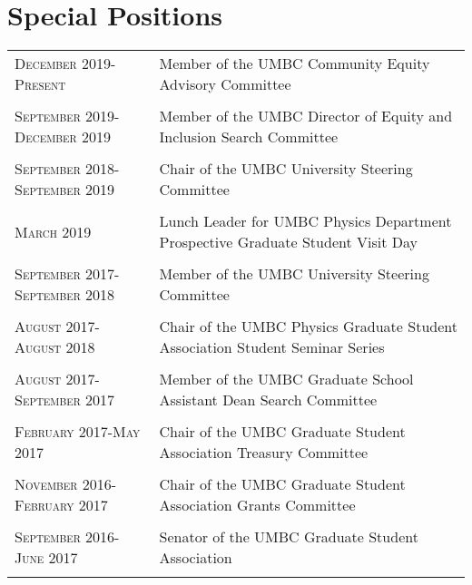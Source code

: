 %
%
%

\section{\texorpdfstring{\color{Blue}Special Positions}{Special Positions}}
\begin{longtable}{p{2.5cm}|p{14.8cm}}
 	\textsc{December 2019-Present}& Member of the UMBC Community Equity Advisory Committee\\
    \multicolumn{2}{c}{} \\
    \textsc{September 2019-December 2019}& Member of the UMBC Director of Equity and Inclusion Search Committee\\
    \multicolumn{2}{c}{} \\
    \textsc{September 2018-September 2019}& Chair of the UMBC University Steering Committee\\
    \multicolumn{2}{c}{} \\
    \textsc{March 2019}& Lunch Leader for UMBC Physics Department Prospective Graduate Student Visit Day\\
    \multicolumn{2}{c}{} \\
    \textsc{September 2017-September 2018}& Member of the UMBC University Steering Committee\\
    \multicolumn{2}{c}{} \\
    \textsc{August 2017-August 2018}& Chair of the UMBC Physics Graduate Student Association Student Seminar Series\\
    \multicolumn{2}{c}{} \\
    \textsc{August 2017-September 2017}& Member of the UMBC Graduate School Assistant Dean Search Committee\\
    \multicolumn{2}{c}{} \\
    \textsc{February 2017-May 2017}& Chair of the UMBC Graduate Student Association Treasury Committee\\
    \multicolumn{2}{c}{} \\
    \textsc{November 2016-February 2017}& Chair of the UMBC Graduate Student Association Grants Committee\\
    \multicolumn{2}{c}{} \\
    \textsc{September 2016-June 2017}& Senator of the UMBC Graduate Student Association\\
    \multicolumn{2}{c}{} \\




\end{longtable}
